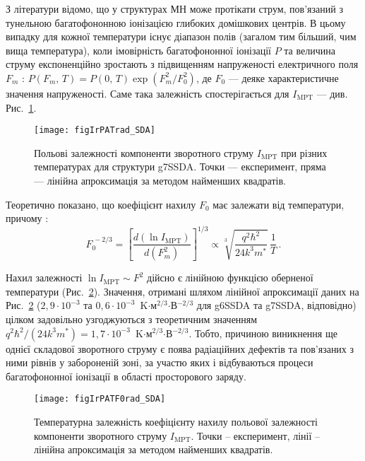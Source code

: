 З літератури \cite{Bulyarskii2001r,Evstropov,Ganichev:2000} відомо, що у структурах МН може протікати струм,
пов’язаний з тунельною багатофононною іонізацією глибоких домішкових центрів.
В цьому випадку для кожної температури існує діапазон полів (загалом тим більший, чим вища температура), коли імовірність багатофононної іонізації $P$
та величина струму експоненційно зростають з підвищенням напруженості електричного поля $F_m$ \cite{Bulyarskii2001r,Ganichev1997,Ganichev:2000}:
$P(F_m,\,T)=P(0,\,T) \exp(F_m^2/F_0^2)$,
де $F_0$ --- деяке характеристичне значення напруженості.
Саме така залежність спостерігається для $I_\mathrm{MPT}$ --- див. Рис.~\ref{figIrPATrad_SDA}.


\begin{figure}
\center
\texttt{[image: figIrPATrad\_SDA]}
\caption{\label{figIrPATrad_SDA}
Польові залежності компоненти зворотного струму $I_\mathrm{MPT}$ при різних температурах для структури g7SSDA.
Точки --- експеримент, пряма --- лінійна апроксимація за методом найменших квадратів.
}%
\end{figure}

Теоретично показано, що коефіцієнт нахилу $F_0$ має залежати від температури, причому \cite{Bulyarskii2001r,Ganichev1997,Ganichev:2000}:
\begin{equation}\label{eqPAT}
    F_0^{\,-2/3}=\left[\frac{d(\ln I_\mathrm{MPT})}{d(F_m^2)}\right]^{1/3}\propto \sqrt[3]{\frac{q^2\hbar^2}{24k^3m^*}}\,\frac{1}{T}\,.
\end{equation}

Нахил залежності $\ln I_\mathrm{MPT}\sim F^2$ дійсно є лінійною функцією оберненої температури (Рис.~\ref{figIrPATF0rad_SDA}).
Значення, отримані шляхом лінійної апроксимації даних на Рис.~\ref{figIrPATF0rad_SDA}
($2,9\cdot10^{-3}$ та $0,6\cdot10^{-3}$~K$\cdot$м$^{2/3}$$\cdot$В$^{-2/3}$ для g6SSDA та g7SSDA, відповідно)
цілком задовільно узгоджуються з теоретичним значенням
$q^2\hbar^2/(24k^3m^*)=1,7\cdot10^{-3}$~K$\cdot$м$^{2/3}$$\cdot$В$^{-2/3}$.
Тобто, причиною виникнення ще однієї складової зворотного струму є поява радіаційних дефектів та пов’язаних з ними рівнів у забороненій зоні,
за участю яких і відбуваються процеси багатофононної іонізації в області просторового заряду.



\begin{figure}
\center
\texttt{[image: figIrPATF0rad\_SDA]}
\caption{\label{figIrPATF0rad_SDA}
Температурна залежність коефіцієнту нахилу польової залежності компоненти зворотного струму $I_\mathrm{MPT}$.
Точки – експеримент, лінії – лінійна апроксимація за методом найменших квадратів.
}%
\end{figure}

